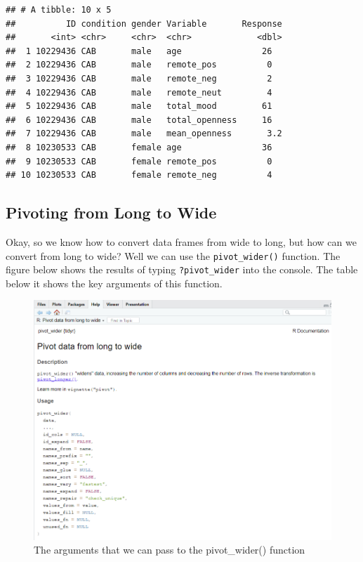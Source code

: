 \documentclass[
]{book}
\begin{document}
\begin{verbatim}
## # A tibble: 10 x 5
##          ID condition gender Variable       Response
##       <int> <chr>     <chr>  <chr>             <dbl>
##  1 10229436 CAB       male   age                26  
##  2 10229436 CAB       male   remote_pos          0  
##  3 10229436 CAB       male   remote_neg          2  
##  4 10229436 CAB       male   remote_neut         4  
##  5 10229436 CAB       male   total_mood         61  
##  6 10229436 CAB       male   total_openness     16  
##  7 10229436 CAB       male   mean_openness       3.2
##  8 10230533 CAB       female age                36  
##  9 10230533 CAB       female remote_pos          0  
## 10 10230533 CAB       female remote_neg          4
\end{verbatim}

\hypertarget{pivoting-from-long-to-wide}{%
\subsection{Pivoting from Long to Wide}\label{pivoting-from-long-to-wide}}

Okay, so we know how to convert data frames from wide to long, but how can we convert from long to wide? Well we can use the \texttt{pivot\_wider()} function. The figure below shows the results of typing \texttt{?pivot\_wider} into the console. The table below it shows the key arguments of this function.

\begin{figure}
\centering
\includegraphics{img/06-pivotwider.png}
\caption{\label{fig:unnamed-chunk-236}The arguments that we can pass to the pivot\_wider() function}
\end{figure}
\end{document}

